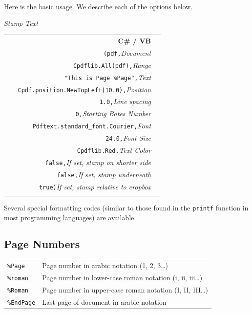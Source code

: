 \documentclass[a4paper]{memoir}
\begin{document}
Here is the basic usage. We describe each of the options below.
\begin{framed}
\noindent\textit{Stamp Text}

\vspace{2mm}
\noindent\begin{tabular}{rl}
\small\sffamily\textbf{C\# / VB} &
\begin{minipage}{4in}
\begin{tabbing}
\small\verb!Cpdflib.AddText                       !\=\\
\small\verb!  (pdf,!\>\textit{Document}\\
\small\verb!   Cpdflib.All(pdf),!\>\textit{Range}\\
\small\verb!   "This is Page %Page",!\>\textit{Text}\\
\small\verb!   Cpdf.position.NewTopLeft(10.0),!\>\textit{Position}\\
\small\verb!   1.0,!\>\textit{Line spacing}\\
\small\verb!   0,!\>\textit{Starting Bates Number}\\
\small\verb!   Pdftext.standard_font.Courier,!\>\textit{Font}\\
\small\verb!   24.0,!\>\textit{Font Size}\\
\small\verb!   Cpdflib.Red,!\>\textit{Text Color}\\
\small\verb!   false,!\>\textit{If set, stamp on shorter side}\\
\small\verb!   false,!\>\textit{If set, stamp underneath}\\
\small\verb!   true)!\>\textit{If set, stamp relative to cropbox}\\
\end{tabbing}
\end{minipage}
\end{tabular}
\end{framed}

Several special formatting codes (similar to those found in the \verb!printf! function in most programming languages) are available.
\subsection{Page Numbers}
  \vspace{2mm}
  \begin{tabular}{ll}
    \texttt{\%Page} & Page number in arabic notation (1, 2, 3\ldots) \\
    \texttt{\%roman} & Page number in lower-case roman notation (i, ii, iii\ldots) \\
    \texttt{\%Roman} & Page number in upper-case roman notation (I, II, III\ldots) \\
    \texttt{\%EndPage} & Last page of document in arabic notation \\
  \end{tabular}
\end{document}
